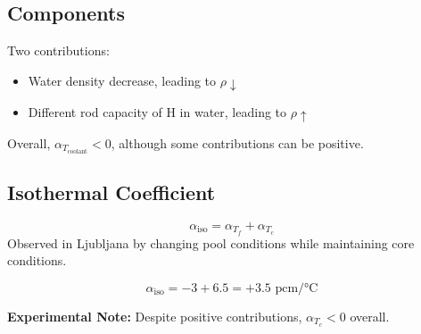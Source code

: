 \subsection{Components}
Two contributions:
\begin{itemize}
    \item Water density decrease, leading to $\rho \downarrow$
    \item Different rod capacity of H in water, leading to $\rho \uparrow$
\end{itemize}

Overall, $\alpha_{T_{\text{coolant}}} < 0$, although some contributions can be positive.

\subsection{Isothermal Coefficient}
\begin{equation}
    \alpha_{\text{iso}} = \alpha_{T_f} + \alpha_{T_c}
\end{equation}
Observed in Ljubljana by changing pool conditions while maintaining core conditions.

\begin{equation}
    \alpha_{\text{iso}} = -3 + 6.5 = +3.5 \text{ pcm/°C}
\end{equation}

\textbf{Experimental Note:} Despite positive contributions, $\alpha_{T_c} < 0$ overall.
